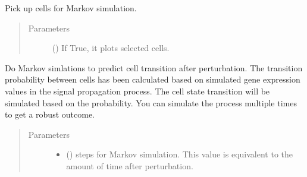 \documentclass[letterpaper,10pt,english]{sphinxmanual}
\begin{document}
\begin{fulllineitems}
\begin{fulllineitems}
\begin{quote}
\begin{description}
\begin{itemize}
\end{itemize}

\end{description}\end{quote}

\end{fulllineitems}


\begin{fulllineitems}
\label{\detokenize{modules/celloracle:celloracle.Oracle.prepare_markov_simulation}}
Pick up cells for Markov simulation.
\begin{quote}\begin{description}
\item[{Parameters}] \leavevmode
{} () \textendash{} If True, it plots selected cells.

\end{description}\end{quote}

\end{fulllineitems}


\begin{fulllineitems}
\label{\detokenize{modules/celloracle:celloracle.Oracle.run_markov_chain_simulation}}
Do Markov simlations to predict cell transition after perturbation.
The transition probability between cells has been calculated
based on simulated gene expression values in the signal propagation process.
The cell state transition will be simulated based on the probability.
You can simulate the process multiple times to get a robust outcome.
\begin{quote}\begin{description}
\item[{Parameters}] \leavevmode\begin{itemize}
\item {} 
 () \textendash{} steps for Markov simulation. This value is equivalent to the amount of time after perturbation.


\end{itemize}
\end{description}
\end{quote}
\end{fulllineitems}
\end{fulllineitems}
\end{document}

